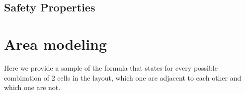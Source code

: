 \documentclass[a4paper]{article}
\begin{document}
\pagebreak
\subsection{Safety Properties}



% 


\pagebreak
\appendix
\section{Area modeling}

Here we provide a sample of the formula that states for every possible combination of 2 cells in the layout, which one are adjacent to each other and which one are not.
\end{document}
